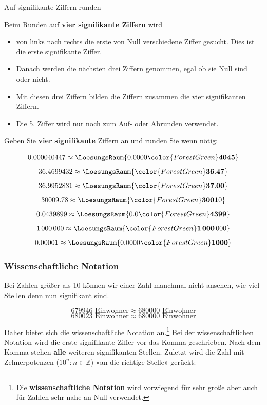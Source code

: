 \newpage


\begin{rezept}{Auf signifikante Ziffern runden}{}
  
  Beim Runden auf \textbf{vier signifikante Ziffern} wird
  \begin{itemize}
  \item  von links nach rechts die erste von Null verschiedene Ziffer gesucht. Dies ist die
    erste signifikante Ziffer.
  \item
    Danach werden die nächsten drei Ziffern
  genommen, egal ob sie Null sind oder nicht. 
\item   Mit diesen drei Ziffern bilden die Ziffern zusammen die vier
  signifikanten Ziffern.
\item  Die 5. Ziffer wird nur noch zum Auf- oder Abrunden verwendet.
  \end{itemize}
\end{rezept}

Geben Sie {\color{ForestGreen}\textbf{vier}} \textbf{signifikante} Ziffern an und runden Sie wenn nötig:

$$0.000040447  \approx \LoesungsRaum{0.0000{\color{ForestGreen}\mathbf{4045}}}$$
$$36.4699432 \approx \LoesungsRaum{{\color{ForestGreen}\mathbf{36.47}}}$$
$$36.9952831 \approx \LoesungsRaum{{\color{ForestGreen}\mathbf{37.00}}}$$
$$30009.78   \approx \LoesungsRaum{{\color{ForestGreen}\mathbf{3001}}0}$$
$$0.0439899  \approx \LoesungsRaum{0.0{\color{ForestGreen}\mathbf{4399}}}$$
$$1\,000\,000 \approx \LoesungsRaum{{\color{ForestGreen}\mathbf{1\,000}}\,000}$$
$$0.00001    \approx \LoesungsRaum{0.0000{\color{ForestGreen}\mathbf{1000}}}$$
\newpage

  
\subsubsection{Wissenschaftliche Notation}\label{wissenschaftlicheNotation}
Bei Zahlen größer als 10 können wir einer Zahl manchmal nicht ansehen, wie viel Stellen denn nun signifikant sind.

$$ 679946 \textrm{\ Einwohner} \approx  680000 \textrm{\ Einwohner}$$
$$ 680023 \textrm{\ Einwohner} \approx  680000 \textrm{\ Einwohner}$$

Daher bietet sich die wissenschaftliche Notation an.\footnote{Die
\textbf{wissenschaftliche Notation} wird vorwiegend für sehr große
aber auch für Zahlen sehr nahe an Null verwendet.}
Bei der wissenschaftlichen Notation wird die erste signifikante Ziffer
vor das Komma geschrieben. Nach dem Komma stehen \textbf{alle} weiteren signifikanten Stellen.
Zuletzt wird die Zahl mit Zehnerpotenzen
($10^{n}: n \in \mathbb{Z}$) «an die richtige Stelle» gerückt:

